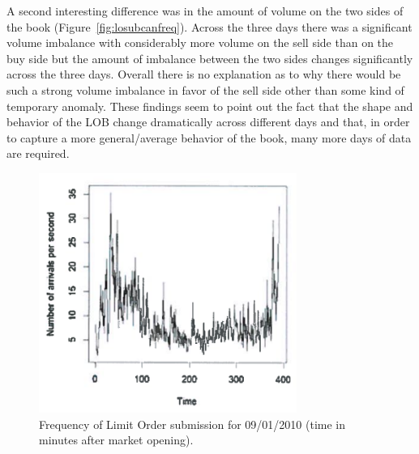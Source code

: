 A second interesting difference was in the amount of volume on the two sides of the book (Figure~\ref{fig:losubcanfreq}). Across the three days there was a significant volume imbalance with considerably more volume on the sell side than on the buy side but the amount of imbalance between the two sides changes significantly across the three days. Overall there is no explanation as to why there would be such a strong volume imbalance in favor of the sell side other than some kind of temporary anomaly. These findings seem to point out the fact that the shape and behavior of the LOB change dramatically across different days and that, in order to capture a more general/average behavior of the book, many more days of data are required. \\
	\begin{figure}[!ht]
   	\centering
   	\includegraphics[width=0.75\textwidth]{chapters/chapter_trade_data_models/figures/freqsubmit.png} 
   	\caption{Frequency of Limit Order submission for 09/01/2010 (time in minutes after market opening). \label{fig:freqsubmit1}}
	\end{figure}
